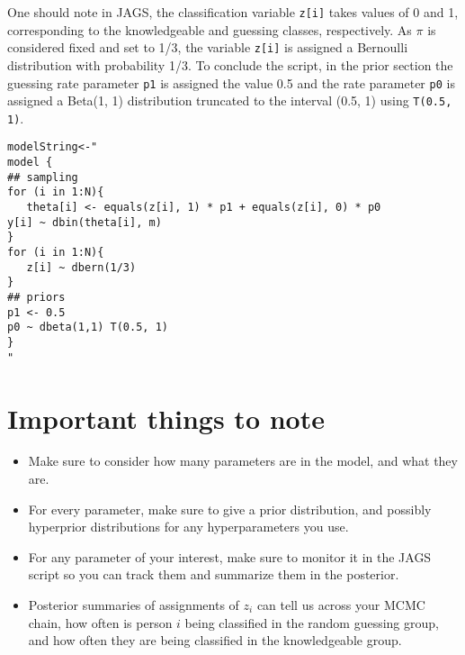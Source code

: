\documentclass[11pt]{article}
\begin{document}
One should note in JAGS, the classification variable \texttt{z[i]} takes values of 0 and 1, corresponding to the knowledgeable and guessing classes, respectively.  As $\pi$ is considered fixed and set to 1/3,  the variable \texttt{z[i]} is assigned a Bernoulli distribution with probability 1/3.  To conclude the script, in the prior section the guessing rate parameter \texttt{p1} is assigned the value 0.5 and the rate parameter \texttt{p0} is assigned a Beta(1, 1) distribution truncated to the interval (0.5, 1) using \texttt{T(0.5, 1)}.

\begin{verbatim}
modelString<-"
model {
## sampling
for (i in 1:N){
   theta[i] <- equals(z[i], 1) * p1 + equals(z[i], 0) * p0
y[i] ~ dbin(theta[i], m)
}
for (i in 1:N){
   z[i] ~ dbern(1/3)
}
## priors
p1 <- 0.5
p0 ~ dbeta(1,1) T(0.5, 1)
}
"
\end{verbatim}

\section{Important things to note} 


\begin{itemize}
\item Make sure to consider how many parameters are in the model, and what they are.

\item For every parameter, make sure to give a prior distribution, and possibly hyperprior distributions for any hyperparameters you use.

\item For any parameter of your interest, make sure to monitor it in the JAGS script so you can track them and summarize them in the posterior.

\item Posterior summaries of assignments of $z_i$ can tell us across your MCMC chain, how often is person $i$ being classified in the random guessing group, and how often they are being classified in the knowledgeable group.
\end{itemize}
\end{document}
